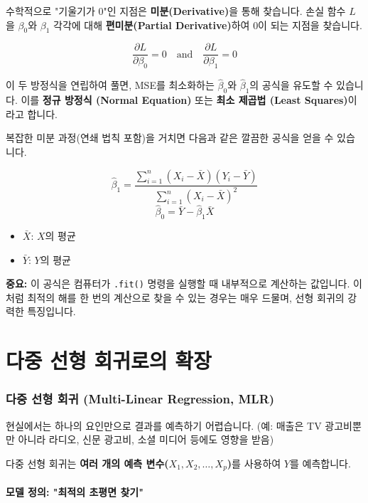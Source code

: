 \documentclass[11pt,a4paper]{book}
\theoremstyle{definition}
\begin{document}
수학적으로 "기울기가 0"인 지점은 \textbf{미분(Derivative)}을 통해 찾습니다.
손실 함수 $L$을 $\beta_0$와 $\beta_1$ 각각에 대해 \textbf{편미분(Partial Derivative)}하여 0이 되는 지점을 찾습니다.

$$ \frac{\partial L}{\partial \beta_0} = 0 \quad \text{and} \quad \frac{\partial L}{\partial \beta_1} = 0 $$

이 두 방정식을 연립하여 풀면, MSE를 최소화하는 $\hat{\beta}_0$와 $\hat{\beta}_1$의 공식을 유도할 수 있습니다. 이를 \textbf{정규 방정식 (Normal Equation)} 또는 \textbf{최소 제곱법 (Least Squares)}이라고 합니다.

\begin{tcolorbox}[title={단순 선형 회귀의 정규 방정식 (Closed-form Solution)}]
복잡한 미분 과정(연쇄 법칙 포함)을 거치면 다음과 같은 깔끔한 공식을 얻을 수 있습니다.

$$ \hat{\beta}_1 = \frac{\sum_{i=1}^{n} (X_i - \bar{X})(Y_i - \bar{Y})}{\sum_{i=1}^{n} (X_i - \bar{X})^2} $$
$$ \hat{\beta}_0 = \bar{Y} - \hat{\beta}_1 \bar{X} $$

\begin{itemize}
    \item $\bar{X}$: $X$의 평균
    \item $\bar{Y}$: $Y$의 평균
\end{itemize}
\textbf{중요:} 이 공식은 컴퓨터가 \texttt{.fit()} 명령을 실행할 때 내부적으로 계산하는 값입니다. 이처럼 최적의 해를 한 번의 계산으로 찾을 수 있는 경우는 매우 드물며, 선형 회귀의 강력한 특징입니다.
\end{tcolorbox}


\part{다중 선형 회귀로의 확장}

\section{다중 선형 회귀 (Multi-Linear Regression, MLR)}

현실에서는 하나의 요인만으로 결과를 예측하기 어렵습니다. (예: 매출은 TV 광고비뿐만 아니라 라디오, 신문 광고비, 소셜 미디어 등에도 영향을 받음)

다중 선형 회귀는 \textbf{여러 개의 예측 변수($X_1, X_2, \dots, X_p$)}를 사용하여 $Y$를 예측합니다.

\subsection{모델 정의: "최적의 초평면 찾기"}
\end{document}

